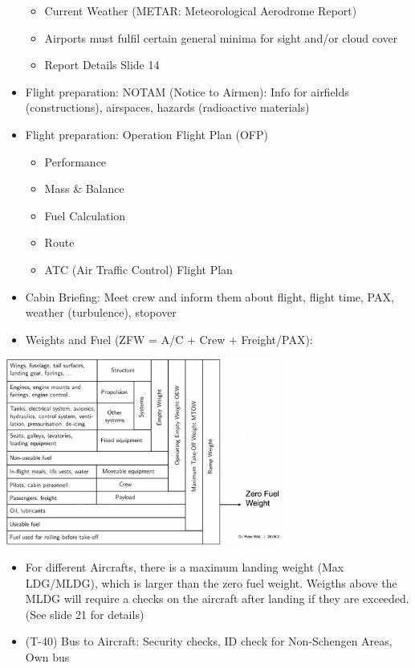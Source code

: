 \documentclass[9pt, landscape, fleqn]{scrartcl}
\begin{document}
\begin{multicols*}{3}
\begin{itemize}
\begin{itemize}
        \item Current Weather (METAR: Meteorological Aerodrome Report)
        \item Airports must fulfil certain general minima for sight and/or cloud cover
        \item Report Details Slide 14
    \end{itemize}
    \item Flight preparation: NOTAM (Notice to Airmen): Info for airfields (constructions), airspaces, hazards (radioactive materials)
    \item Flight preparation: Operation Flight Plan (OFP)
    \begin{itemize}
        \item Performance
        \item Mass \& Balance 
        \item Fuel Calculation
        \item Route 
        \item ATC (Air Traffic Control) Flight Plan 
    \end{itemize}
    \item Cabin Briefing: Meet crew and inform them about flight, flight time, PAX, weather (turbulence), stopover
    \item Weights and Fuel (ZFW = A/C + Crew + Freight/PAX):
\end{itemize}
\begin{center}
    \includegraphics[width=9cm]{Images/Weight_and_Fuel.png}
\end{center}
\begin{itemize}
    \item For different Aircrafts, there is a maximum landing weight (Max LDG/MLDG), which is larger than the zero fuel weight. Weigths above the MLDG will require a checks on the aircraft after landing if they are exceeded. (See slide 21 for details)
    \item (T-40) Bus to Aircraft: Security checks, ID check for Non-Schengen Areas, Own bus 

\end{itemize}
\end{multicols*}
\end{document}
